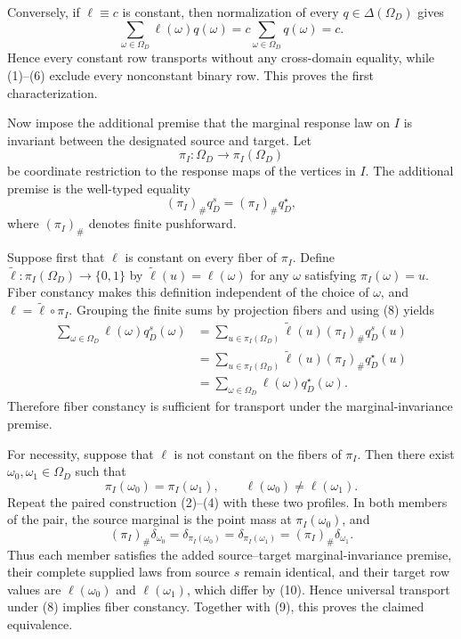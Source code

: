 Conversely, if \(\ell\equiv c\) is constant, then normalization of every \(q\in\Delta(\Omega_D)\) gives
\[
\sum_{\omega\in\Omega_D}\ell(\omega)q(\omega)
=c\sum_{\omega\in\Omega_D}q(\omega)
=c.
\tag{7}
\]
Hence every constant row transports without any cross-domain equality, while (1)--(6) exclude every nonconstant binary row. This proves the first characterization.

Now impose the additional premise that the marginal response law on \(I\) is invariant between the designated source and target. Let
\[
\pi_I:\Omega_D\longrightarrow\pi_I(\Omega_D)
\]
be coordinate restriction to the response maps of the vertices in \(I\). The additional premise is the well-typed equality
\[
(\pi_I)_{\#}q_D^s=(\pi_I)_{\#}q_D^\star,
\tag{8}
\]
where \((\pi_I)_{\#}\) denotes finite pushforward.

Suppose first that \(\ell\) is constant on every fiber of \(\pi_I\). Define \(\widetilde\ell:\pi_I(\Omega_D)\to\{0,1\}\) by \(\widetilde\ell(u)=\ell(\omega)\) for any \(\omega\) satisfying \(\pi_I(\omega)=u\). Fiber constancy makes this definition independent of the choice of \(\omega\), and \(\ell=\widetilde\ell\circ\pi_I\). Grouping the finite sums by projection fibers and using (8) yields
\[
\begin{aligned}
\sum_{\omega\in\Omega_D}\ell(\omega)q_D^s(\omega)
&=\sum_{u\in\pi_I(\Omega_D)}
  \widetilde\ell(u)(\pi_I)_{\#}q_D^s(u)\\
&=\sum_{u\in\pi_I(\Omega_D)}
  \widetilde\ell(u)(\pi_I)_{\#}q_D^\star(u)\\
&=\sum_{\omega\in\Omega_D}\ell(\omega)q_D^\star(\omega).
\end{aligned}
\tag{9}
\]
Therefore fiber constancy is sufficient for transport under the marginal-invariance premise.

For necessity, suppose that \(\ell\) is not constant on the fibers of \(\pi_I\). Then there exist \(\omega_0,\omega_1\in\Omega_D\) such that
\[
\pi_I(\omega_0)=\pi_I(\omega_1),
\qquad
\ell(\omega_0)\ne\ell(\omega_1).
\tag{10}
\]
Repeat the paired construction (2)--(4) with these two profiles. In both members of the pair, the source marginal is the point mass at \(\pi_I(\omega_0)\), and
\[
(\pi_I)_{\#}\delta_{\omega_0}
=\delta_{\pi_I(\omega_0)}
=\delta_{\pi_I(\omega_1)}
=(\pi_I)_{\#}\delta_{\omega_1}.
\tag{11}
\]
Thus each member satisfies the added source--target marginal-invariance premise, their complete supplied laws from source \(s\) remain identical, and their target row values are \(\ell(\omega_0)\) and \(\ell(\omega_1)\), which differ by (10). Hence universal transport under (8) implies fiber constancy. Together with (9), this proves the claimed equivalence.

